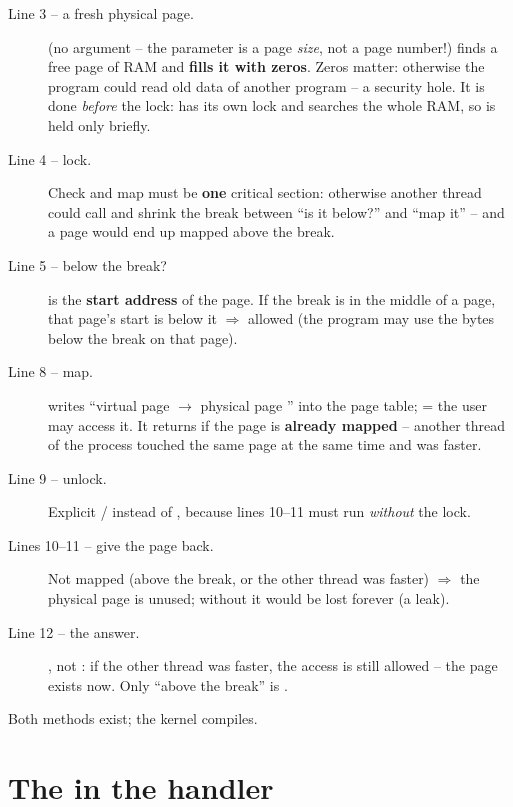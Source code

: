 \documentclass[11pt]{report}
\newcommand{\done}[1]{\begin{keybox}[title={Done when}]#1\end{keybox}}
\begin{document}
\begin{description}
  \item[Line 3 -- a fresh physical page.]  (no argument -- the parameter is a page
        \emph{size}, not a page number!) finds a free page of RAM and \textbf{fills it with zeros}. Zeros
        matter: otherwise the program could read old data of another program -- a security hole.
        It is done \emph{before} the lock:  has its own lock and searches the whole RAM, so
         is held only briefly.
  \item[Line 4 -- lock.] Check and map must be \textbf{one} critical section: otherwise another thread
        could call  and shrink the break between ``is it below?'' and ``map it'' -- and a page
        would end up mapped above the break.
  \item[Line 5 -- below the break?]  is the \textbf{start address} of the page.
        If the break is in the middle of a page, that page's start is below it $\Rightarrow$ allowed (the
        program may use the bytes below the break on that page).
  \item[Line 8 -- map.]  writes ``virtual page  $\to$ physical page
        '' into the page table;  = the user may access it. It returns  if the
        page is \textbf{already mapped} -- another thread of the process touched the same page at the same
        time and was faster.
  \item[Line 9 -- unlock.] Explicit / instead of , because
        lines 10--11 must run \emph{without} the lock.
  \item[Lines 10--11 -- give the page back.] Not mapped (above the break, or the other thread was faster)
        $\Rightarrow$ the physical page is unused; without  it would be lost forever (a leak).
  \item[Line 12 -- the answer.] , not : if the other thread was faster, the access
        is still allowed -- the page exists now. Only ``above the break'' is .
\end{description}

\done{Both  methods exist; the kernel compiles.}

\section{The  in the handler \hfill {\normalsize{}}}
\end{document}
